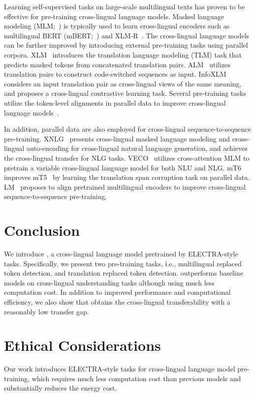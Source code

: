 \documentclass[11pt]{article}
\newcommand\our{\makebox{\textsc{XLM-E}}}
\newcommand\ele{\textsc{ELECTRA}}
\begin{document}
Learning self-supervised tasks on large-scale multilingual texts has proven to be effective for pre-training cross-lingual language models. 
Masked language modeling (MLM;~\citealt{bert}) is typically used to learn cross-lingual encoders such as multilingual BERT (mBERT;~\citealt{bert}) and XLM-R~\cite{xlmr}.
The cross-lingual language models can be further improved by introducing external pre-training tasks using parallel corpora.
XLM~\cite{xlm} introduces the translation language modeling (TLM) task that predicts masked tokens from concatenated translation pairs. ALM~\cite{alm} utilizes translation pairs to construct code-switched sequences as input. 
InfoXLM~\cite{infoxlm} considers an input translation pair as cross-lingual views of the same meaning, and proposes a cross-lingual contrastive learning task.
Several pre-training tasks utilize the token-level alignments in parallel data to improve cross-lingual language models~\cite{Cao2020Multilingual,zhao2020inducing,hu2020explicit,xlmalign}.

In addition, parallel data are also employed for cross-lingual sequence-to-sequence pre-training.
XNLG~\cite{xnlg} presents cross-lingual masked language modeling and cross-lingual auto-encoding for cross-lingual natural language generation, and achieves the cross-lingual transfer for NLG tasks. VECO~\cite{veco} utilizes cross-attention MLM to pretrain a variable cross-lingual language model for both NLU and NLG. mT6~\cite{mt6} improves mT5~\cite{mt5} by learning the translation span corruption task on parallel data. LM~\cite{deltalm} proposes to align pretrained multilingual encoders to improve cross-lingual sequence-to-sequence pre-training.


\section{Conclusion}

We introduce \our{}, a cross-lingual language model pretrained by \ele{}-style tasks.
Specifically, we present two pre-training tasks, i.e., multilingual replaced token detection, and translation replaced token detection.
\our{} outperforms baseline models on cross-lingual understanding tasks although using much less computation cost.
In addition to improved performance and computational efficiency, we also show that \our{} obtains the cross-lingual transferability with a reasonably low transfer gap.


\section{Ethical Considerations}
Our work introduces ELECTRA-style tasks for cross-lingual language model pre-training, which requires much less computation cost than previous models and substantially reduces the energy cost.
\end{document}
